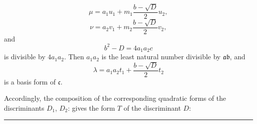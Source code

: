 \[
\mu = a_1 u_1 + m_1 \frac{b - \sqrt{D}}{2} u_2,
\]
\[
\nu = a_2 v_1 + m_2 \frac{b - \sqrt{D}}{2} v_2,
\]
and
\[
b^2 - D = 4a_1 a_2 c
\]
is divisible by $4a_1 a_2$. Then $a_1 a_2$ is the least natural number divisible by $\mathfrak{a}\mathfrak{b}$, and
\[
\lambda = a_1 a_2 t_1 + \frac{b - \sqrt{D}}{2} t_2
\]
is a basis form of $\mathfrak{c}$.

Accordingly, the composition of the corresponding quadratic forms of the discriminants $D_1$, $D_2$:
gives the form $T$ of the discriminant $D$:

\begin{center}\rule{0.32\linewidth}{0.4pt}\end{center}
